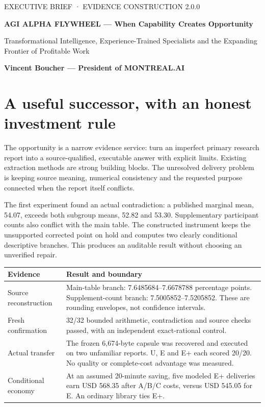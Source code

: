 \documentclass[10pt]{article}
\begin{document}
{\sffamily\small\color{teal}EXECUTIVE BRIEF · EVIDENCE CONSTRUCTION 2.0.0}
\vspace{3mm}

{\sffamily\bfseries\fontsize{18}{22}\selectfont\color{navy}AGI ALPHA FLYWHEEL — When Capability Creates Opportunity\par}
\vspace{2mm}
{\sffamily Transformational Intelligence, Experience-Trained Specialists and the Expanding Frontier of Profitable Work\par}
\textbf{Vincent Boucher — President of MONTREAL.AI}

\section*{A useful successor, with an honest investment rule}

The opportunity is a narrow evidence service: turn an imperfect primary research report into a source-qualified, executable answer with explicit limits. Existing extraction methods are strong building blocks. The unresolved delivery problem is keeping source meaning, numerical consistency and the requested purpose connected when the report itself conflicts.

The first experiment found an actual contradiction: a published marginal mean, 54.07, exceeds both subgroup means, 52.82 and 53.30. Supplementary participant counts also conflict with the main table. The constructed instrument keeps the unsupported corrected point on hold and computes two clearly conditional descriptive branches. This produces an auditable result without choosing an unverified repair.

\begin{tabularx}{\textwidth}{p{}Y}
\toprule Evidence & Result and boundary\\\midrule
Source reconstruction & Main-table branch: 7.6485684--7.6678788 percentage points. Supplement-count branch: 7.5005852--7.5205852. These are rounding envelopes, not confidence intervals.\\
Fresh confirmation & 32/32 bounded arithmetic, contradiction and source checks passed, with an independent exact-rational control.\\
Actual transfer & The frozen 6,674-byte capsule was recovered and executed on two unfamiliar reports. U, E and E+ each scored 20/20. No quality or complete-cost advantage was measured.\\
Conditional economy & At an assumed 20-minute saving, five modeled E+ deliveries earn USD 568.35 after A/B/C costs, versus USD 545.05 for E. An ordinary library ties E+.\\\bottomrule
\end{tabularx}
\end{document}
